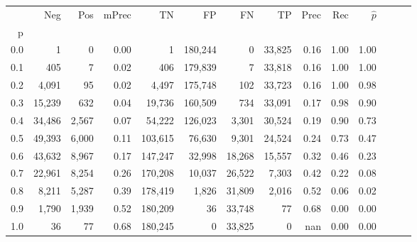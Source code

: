 \begin{tabular}{rrrrrrrrrrrrrr}
\toprule
{} &     Neg &    Pos & mPrec &       TN &       FP &      FN &      TP &  Prec &   Rec & $\hat{p}$ \\
p   &         &        &       &          &          &         &         &       &       &           \\
\midrule
0.0 &       1 &      0 &  0.00 &        1 &  180,244 &       0 &  33,825 &  0.16 &  1.00 &      1.00 \\
0.1 &     405 &      7 &  0.02 &      406 &  179,839 &       7 &  33,818 &  0.16 &  1.00 &      1.00 \\
0.2 &   4,091 &     95 &  0.02 &    4,497 &  175,748 &     102 &  33,723 &  0.16 &  1.00 &      0.98 \\
0.3 &  15,239 &    632 &  0.04 &   19,736 &  160,509 &     734 &  33,091 &  0.17 &  0.98 &      0.90 \\
0.4 &  34,486 &  2,567 &  0.07 &   54,222 &  126,023 &   3,301 &  30,524 &  0.19 &  0.90 &      0.73 \\
0.5 &  49,393 &  6,000 &  0.11 &  103,615 &   76,630 &   9,301 &  24,524 &  0.24 &  0.73 &      0.47 \\
0.6 &  43,632 &  8,967 &  0.17 &  147,247 &   32,998 &  18,268 &  15,557 &  0.32 &  0.46 &      0.23 \\
0.7 &  22,961 &  8,254 &  0.26 &  170,208 &   10,037 &  26,522 &   7,303 &  0.42 &  0.22 &      0.08 \\
0.8 &   8,211 &  5,287 &  0.39 &  178,419 &    1,826 &  31,809 &   2,016 &  0.52 &  0.06 &      0.02 \\
0.9 &   1,790 &  1,939 &  0.52 &  180,209 &       36 &  33,748 &      77 &  0.68 &  0.00 &      0.00 \\
1.0 &      36 &     77 &  0.68 &  180,245 &        0 &  33,825 &       0 &   nan &  0.00 &      0.00 \\
\bottomrule
\end{tabular}
